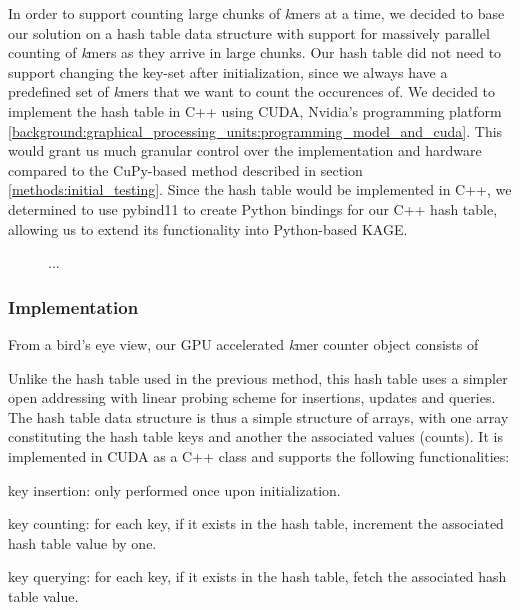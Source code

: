 In order to support counting large chunks of \textit{k}mers at a time, we decided to base our solution on a hash table data structure with support for massively parallel counting of \textit{k}mers as they arrive in large chunks.
Our hash table did not need to support changing the key-set after initialization, since we always have a predefined set of \textit{k}mers that we want to count the occurences of.
We decided to implement the hash table in C++ using CUDA, Nvidia's programming platform \ref{background:graphical_processing_units:programming_model_and_cuda}.
This would grant us much granular control over the implementation and hardware compared to the CuPy-based method described in section \ref{methods:initial_testing}.
Since the hash table would be implemented in C++, we determined to use pybind11 \cite{pybind11} to create Python bindings for our C++ hash table, allowing us to extend its functionality into Python-based KAGE.

\begin{figure}[H]
\begin{center}
\scalebox{1}{
\begin{tikzpicture}

\end{tikzpicture}
}
\caption{
  ...
}
\label{methods:gpu_accelerating_kmer_counting:design_requirements_and_choices:figure}
\end{center}
\end{figure}

\subsubsection{Implementation}
From a bird's eye view, our GPU accelerated \textit{k}mer counter object consists of

Unlike the hash table used in the previous method, this hash table uses a simpler open addressing with linear probing scheme for insertions, updates and queries.
The hash table data structure is thus a simple structure of arrays, with one array constituting the hash table keys and another the associated values (counts).
It is implemented in CUDA as a C++ class and supports the following functionalities:
\begin{compactitem}
  \item key insertion: only performed once upon initialization.
  \item key counting: for each key, if it exists in the hash table, increment the associated hash table value by one.
  \item key querying: for each key, if it exists in the hash table, fetch the associated hash table value.
\end{compactitem}

